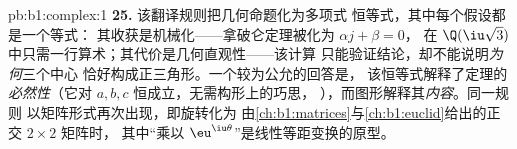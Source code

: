 \begin{solution}{pb:b1:complex:1}
\textbf{25.} 该翻译规则把几何命题化为多项式
恒等式，其中每个假设都是一个等式：
其收获是机械化——拿破仑定理被化为
$\alpha j + \beta = 0$，
在 $\Q(\iu\sqrt3)$ 中只需一行算术；其代价是几何直观性——该计算
只能验证结论，却不能说明\emph{为何}三个中心
恰好构成正三角形。一个较为公允的回答是，
该恒等式解释了定理的\emph{必然性}（它对
$a, b, c$ 恒成立，无需构形上的巧思，
），而图形解释其\emph{内容}。同一规则
以矩阵形式再次出现，即旋转化为
由\cref{ch:b1:matrices}与\cref{ch:b1:euclid}给出的正交 $2 \times 2$ 矩阵时，
其中“乘以
$\eu^{\iu\theta}$”是线性等距变换的原型。
\end{solution}

